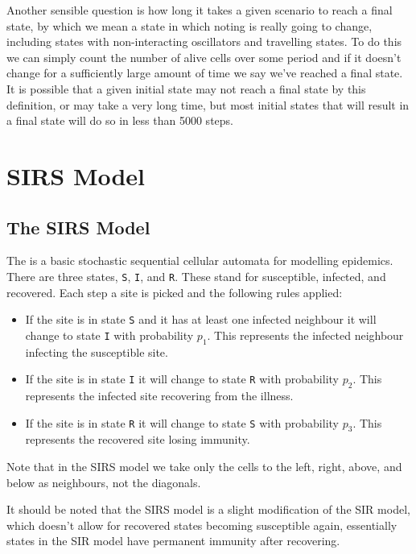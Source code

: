 \documentclass[fleqn]{NotesClass}
\begin{document}
    Another sensible question is how long it takes a given scenario to reach a final state, by which we mean a state in which noting is really going to change, including states with non-interacting oscillators and travelling states.
    To do this we can simply count the number of alive cells over some period and if it doesn't change for a sufficiently large amount of time we say we've reached a final state.
    It is possible that a given initial state may not reach a final state by this definition, or may take a very long time, but most initial states that will result in a final state will do so in less than 5000 steps.
    
    \chapter{SIRS Model}
    \section{The SIRS Model}
    The  is a basic stochastic sequential cellular automata for modelling epidemics.
    There are three states, \texttt{S}, \texttt{I}, and \texttt{R}.
    These stand for susceptible, infected, and recovered.
    Each step a site is picked and the following rules applied:
    \begin{itemize}
        \item If the site is in state \texttt{S} and it has at least one infected neighbour it will change to state \texttt{I} with probability \(p_1\).
        This represents the infected neighbour infecting the susceptible site.
        \item If the site is in state \texttt{I} it will change to state \texttt{R} with probability \(p_2\).
        This represents the infected site recovering from the illness.
        \item If the site is in state \texttt{R} it will change to state \texttt{S} with probability \(p_3\).
        This represents the recovered site losing immunity.
    \end{itemize}
    Note that in the SIRS model we take only the cells to the left, right, above, and below as neighbours, not the diagonals.
    
    It should be noted that the SIRS model is a slight modification of the SIR model, which doesn't allow for recovered states becoming susceptible again, essentially states in the SIR model have permanent immunity after recovering.
    
\end{document}
